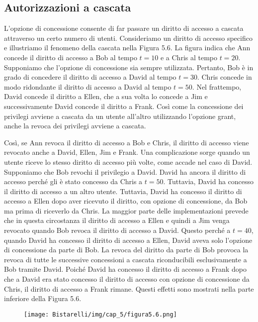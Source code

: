 \subsection{Autorizzazioni a cascata}
L'opzione di concessione consente di far passare un diritto di accesso a cascata attraverso un certo numero di utenti. 
Consideriamo un diritto di accesso specifico e illustriamo il fenomeno della cascata nella Figura 5.6. La figura indica che Ann concede il diritto di accesso a Bob al tempo $t = 10$ e a Chris al tempo $t = 20$. Supponiamo che l'opzione di concessione sia sempre utilizzata. Pertanto, Bob è in grado di concedere il diritto di accesso a David al tempo $t = 30$. Chris concede in modo ridondante il diritto di accesso a David al tempo $t = 50$. Nel frattempo, David concede il diritto a Ellen, che a sua volta lo concede a Jim e successivamente David concede il diritto a Frank. Così come la concessione dei privilegi avviene a cascata da un utente all'altro utilizzando l'opzione grant, anche la revoca dei privilegi avviene a cascata. 

\singlespacing

Così, se Ann revoca il diritto di accesso a Bob e Chris, il diritto di accesso viene revocato anche a David, Ellen, Jim e Frank. Una complicazione sorge quando un utente riceve lo stesso diritto di accesso più volte, come accade nel caso di David. Supponiamo che Bob revochi il privilegio a David. David ha ancora il diritto di accesso perché gli è stato concesso da Chris a $t = 50$. Tuttavia, David ha concesso il diritto di accesso a un altro utente. Tuttavia, David ha concesso il diritto di accesso a Ellen dopo aver ricevuto il diritto, con opzione di concessione, da Bob ma prima di riceverlo da Chris. La maggior parte delle implementazioni prevede che in questa circostanza il diritto di accesso a Ellen e quindi a Jim venga revocato quando Bob revoca il diritto di accesso a David. Questo perché a $t = 40$, quando David ha concesso il diritto di accesso a Ellen, David aveva solo l'opzione di concessione da parte di Bob. La revoca del diritto da parte di Bob provoca la revoca di tutte le successive concessioni a cascata riconducibili esclusivamente a Bob tramite David. Poiché David ha concesso il diritto di accesso a Frank dopo che a David era stato concesso il diritto di accesso con opzione di concessione da Chris, il diritto di accesso a Frank rimane. Questi effetti sono mostrati nella parte inferiore della Figura 5.6.


\begin{figure}[H]
	\centering
    \texttt{[image: Bistarelli/img/cap\_5/figura5.6.png]}
\end{figure}


